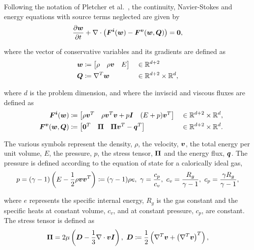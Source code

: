 Following the notation of Pletcher et al.~\cite[Chapter ]{Pletcher1997}, the continuity, Navier-Stokes and energy equations with source terms neglected are given by
\begin{align} \label{eq:NavierStokes_std}
\frac{\partial \varv{w}}{\partial t} + 
\nabla \cdot \left( \varv{F^i}(\varv{w}) - \varv{F^v}(\varv{w},\varv{Q}) \right) = \vect{0},
\end{align}

where the vector of conservative variables and its gradients are defined as
\begin{alignat}{3}
\varv{w} & \coloneqq \begin{bmatrix} \rho & \rho\varv{v} & E \end{bmatrix}
&& \in \mathbb{R}^{d+2} \nonumber \\
\varv{Q} & \coloneqq \nabla^T \varv{w}
&& \in \mathbb{R}^{d+2} \times \mathbb{R}^{d}, \label{eq:Gradients}
\end{alignat}

where $d$ is the problem dimension, and where the inviscid and viscous fluxes are defined as
\begin{alignat}{4}
&& \mathit{\bm{{F^i}}}(\mathit{\bm{{w}}}) & \coloneqq
\begin{bmatrix} \rho\mathit{\bm{{v}}}^T & \rho \mathit{\bm{{v}}}^T \mathit{\bm{{v}}} + p \mathit{\bm{{I}}} & (E+p) \mathit{\bm{{v}}}^T \end{bmatrix}
&& \in \mathbb{R}^{d+2} \times \mathbb{R}^{d}, \label{eq:F_inviscid} \\
&& \mathit{\bm{{F^v}}}(\mathit{\bm{{w}}},\mathit{\bm{{Q}}}) & \coloneqq
\begin{bmatrix} \mathbf{{0}}^T & \mathit{\bm{{\Pi}}} & \mathit{\bm{{\Pi}}} \mathit{\bm{{v}}}^T - \mathit{\bm{{q}}}^T \end{bmatrix}
&& \in \mathbb{R}^{d+2} \times \mathbb{R}^{d}. \label{eq:F_viscous}
\end{alignat}

The various symbols represent the density, $\rho$, the velocity, $\mathit{\bm{{v}}}$, the total energy per unit volume, $E$, the pressure, $p$, the stress tensor, $\mathit{\bm{{\Pi}}}$ and the energy flux, $\mathit{\bm{{q}}}$. The pressure is defined according to the equation of state for a calorically ideal gas,
\begin{align*}
p 
=
(\gamma-1) \left( E - \frac{1}{2} \rho \mathit{\bm{{v}}} \mathit{\bm{{v}}}^T \right)
\coloneqq
(\gamma-1) \rho e,\ \gamma = \frac{c_p}{c_v},\ c_v = \frac{R_g}{\gamma-1},\ c_p = \frac{\gamma R_g}{\gamma-1},
\end{align*}

where $e$ represents the specific internal energy, $R_g$ is the gas constant and the specific heats at constant volume, $c_v$, and at constant pressure, $c_p$, are constant. The stress tensor is defined as
\begin{align*}
\varv{\Pi} = 2\mu \left( \varv{D} - \frac{1}{3} \nabla \cdot \varv{v} \varv{I} \right),\ \varv{D} \coloneqq \frac{1}{2} \left(\nabla^T \varv{v} + \left(\nabla^T \varv{v}\right)^T \right),
\end{align*}

